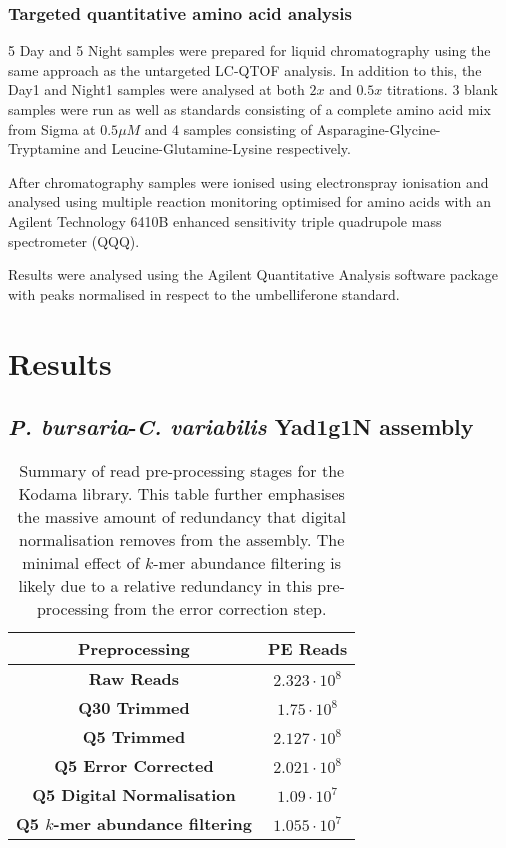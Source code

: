 \subsubsection{Targeted quantitative amino acid analysis}

5 Day and 5 Night samples were prepared for liquid chromatography
using the same approach as the untargeted LC-QTOF analysis.
In addition to this, the Day1 and Night1 samples were analysed at both
\(2x\) and \(0.5x\) titrations.  3 blank samples were run 
as well as standards consisting of a complete amino acid
mix from Sigma at \(0.5\mu M\) and 4 samples consisting of Asparagine-Glycine-Tryptamine
and Leucine-Glutamine-Lysine respectively.

After chromatography samples were ionised using electronspray ionisation
and analysed using multiple reaction monitoring optimised
for amino acids with an Agilent Technology
6410B enhanced sensitivity triple quadrupole mass spectrometer (QQQ).

Results were analysed using the Agilent Quantitative Analysis software package
with peaks normalised in respect to the umbelliferone standard. 

\section{Results}

\subsection{\textit{P. bursaria}-\textit{C. variabilis} Yad1g1N assembly}

\begin{table}
    \centering
    \begin{tabular}{|c|c|}
        \hline
        \textbf{Preprocessing} & \textbf{PE Reads} \\
        \hline
        \textbf{Raw Reads}  & \(2.323\cdot10^{8}\)\\
        \textbf{Q30 Trimmed} & \(1.75\cdot10^{8}\)\\
        \textbf{Q5 Trimmed}  & \(2.127\cdot10^{8} \) \\
        \textbf{Q5 Error Corrected}  & \(2.021\cdot10^{8}\)\\
        \textbf{Q5 Digital Normalisation} & \(1.09 \cdot10^{7}\)\\ 
        \textbf{Q5 \(k\)-mer abundance filtering} & \(1.055\cdot10^{7}\)\\
        \hline
    \end{tabular}
    \caption[Results of various types of pre-processing for the Yad1g1N transcriptome]{
        Summary of read pre-processing stages for the Kodama library.  This
        table further emphasises the massive amount of redundancy that digital normalisation 
        removes from the assembly. The minimal effect of \(k\)-mer abundance filtering
        is likely due to a relative redundancy in this pre-processing from the error
    correction step.}
    \label{tab:kodama_preproc}
\end{table}

